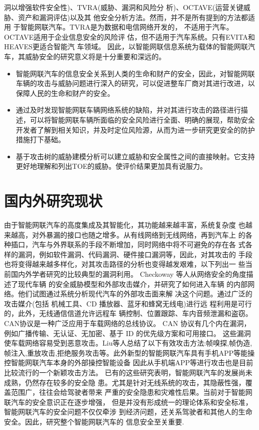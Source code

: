 洞以增强软件安全性)、TVRA(威胁、漏洞和风险分
析)、OCTAVE(运营关键威胁、资产和漏洞评估)以及其
他安全分析方法。然而，并不是所有提到的方法都适用
于智能网联汽车。TVRA是为数据和电信网络开发的，
不适用于汽车。OCTAVE适用于企业信息安全的风险评
估，但不适用于汽车系统。只有EVITA和HEAVES更适合智能汽
车领域。
\newline
因此，以智能网联信息系统为载体的智能网联汽车，其威胁安全的研究意义将是十分重要和深远的。
\begin{itemize}
  \item 智能网联汽车的信息安全关系到人类的生命和财产的安全，因此，对智能网联车辆的攻击与威胁问题进行深入的研究，可以促进整车厂商对其进行改进，以保障人民的生命和财产的安全。
  \item 通过及时发现智能网联车辆网络系统的缺陷，并对其进行攻击的路径进行描述，可以将智能网联车辆所面临的安全风险进行全面、明确的展现，帮助安全开发者了解到相关知识，并及时定位风险源，从而为进一步研究更安全的防护措施打下基础。
  \item 基于攻击树的威胁建模分析可以建立威胁和安全属性之间的直接映射。它支持更好地理解和列出TOE的威胁。使评价结果更加具有说服力。
\end{itemize}
\section{国内外研究现状}
由于智能网联汽车的高度集成及其智能化，其功能越来越丰富，系统复杂度
也越来越高，对外暴漏的接口也随之增多。从有线网络到无线网络，再到汽车上
的各种插口，汽车与外界联系的手段不断增加，同时网络中将不可避免的存在各
式各样的漏洞，例如软件漏洞、代码漏洞、硬件接口漏洞等，因此，对其攻击的
手段也将变得越来越多样化，对其攻击路径的分析也变得越发艰难，以下列出一
些当前国内外学者研究的比较典型的漏洞利用。
\newline
Checkoway 等人从网络安全的角度描述了现代车辆
的安全威胁模型和外部攻击媒介，并研究了如何进入车辆
的内部网络。他们试图通过系统分析现代汽车的外部攻击面来解
决这个问题。通过广泛的攻击媒介(包括
机械工具、CD 播放器、蓝牙和蜂窝无线电)进行远
程利用是可行的，此外，无线通信信道允许远程车
辆控制、位置跟踪、车内音频泄漏和盗窃。
CAN协议是一种广泛应用于车载网络的总线协议。
CAN 协议有几个内在漏洞，例如广播传输、无认证、无加密、基于 ID 的优先级方案和可用接口。
这些漏洞使车载网络容易受到恶意攻击。Liu等人总结了以下有效攻击方法:帧嗅探,帧伪造,
帧注入,重放攻击,拒绝服务攻击等。此外新型的智能网联汽车具有手机APP等能操控智能网联汽车本身的外部操控智能设备
因此从手机端APP等进行攻击也是目前比较流行的一个新颖攻击方法。
\newline
已有的这些研究表明，智能网联汽车的发展尚未成熟，仍然存在较多的安全隐
患。尤其是针对无线系统的攻击，其隐蔽性强，覆盖范围广，往往会给驾驶者带来
严重的安全隐患和灾难性后果。当前对于智能网联汽车的安全意识正在逐步增强，
但是并没有形成统一的理论体系和安全标准，智能网联汽车的安全问题不仅仅牵涉
到经济问题，还关系驾驶者和其他人的生命安全。因此，研究整个智能网联汽车的
信息安全至关重要.
